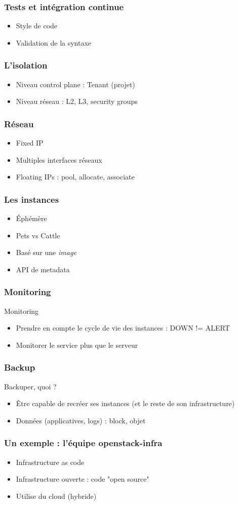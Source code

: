   \begin{frame}
    \frametitle{Tests et intégration continue}
    \begin{itemize}
      \item Style de code
      \item Validation de la syntaxe
    \end{itemize}
  \end{frame}

  \begin{frame}
    \frametitle{L'isolation}
    \begin{itemize}
      \item Niveau control plane : Tenant (projet)
      \item Niveau réseau : L2, L3, security groups
    \end{itemize}
  \end{frame}

  \begin{frame}
    \frametitle{Réseau}
    \begin{itemize}
      \item Fixed IP
      \item Multiples interfaces réseaux
      \item Floating IPs : pool, allocate, associate
    \end{itemize}
  \end{frame}

  \begin{frame}
    \frametitle{Les instances}
    \begin{itemize}
      \item Éphémère
      \item Pets vs Cattle
      \item Basé sur une \textit{image}
      \item API de metadata
    \end{itemize}
  \end{frame}

  \begin{frame}
    \frametitle{Monitoring}
    Monitoring
    \begin{itemize}
      \item Prendre en compte le cycle de vie des instances : DOWN != ALERT
      \item Monitorer le service plus que le serveur
    \end{itemize}
  \end{frame}

  \begin{frame}
    \frametitle{Backup}
    Backuper, quoi ?
    \begin{itemize}
      \item Être capable de recréer ses instances (et le reste de son infrastructure)
      \item Données (applicatives, logs) : block, objet
    \end{itemize}
  \end{frame}

  \begin{frame}
    \frametitle{Un exemple : l'équipe openstack-infra}
    \begin{itemize}
      \item Infrastructure as code
      \item Infrastructure ouverte : code "open source"
      \item Utilise du cloud (hybride)
    \end{itemize}
  \end{frame}
